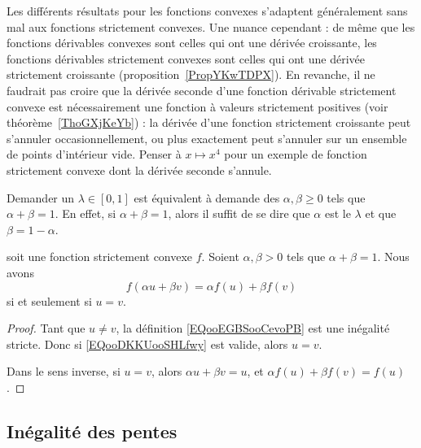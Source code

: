 \begin{normaltext}
	Les différents résultats pour les fonctions convexes s'adaptent généralement sans mal aux fonctions strictement convexes. Une nuance cependant : de même que les fonctions dérivables convexes sont celles qui ont une dérivée croissante, les fonctions dérivables strictement convexes sont celles qui ont une dérivée strictement croissante (proposition~\ref{PropYKwTDPX}). En revanche, il ne faudrait pas croire que la dérivée seconde d'une fonction dérivable strictement convexe est nécessairement une fonction à valeurs strictement positives (voir théorème~\ref{ThoGXjKeYb}) : la dérivée d'une fonction strictement croissante peut s'annuler occasionnellement, ou plus exactement peut s'annuler sur un ensemble de points d'intérieur vide. Penser à \( x\mapsto x^4\) pour un exemple de fonction strictement convexe dont la dérivée seconde s'annule.
\end{normaltext}

\begin{normaltext}
	Demander un \( \lambda\in[0 ,1]\) est équivalent à demande des \( \alpha,\beta\geq 0\) tels que \( \alpha+\beta=1\). En effet, si \( \alpha+\beta=1\), alors il suffit de se dire que \( \alpha\) est le \( \lambda\) et que \( \beta=1-\alpha\).
\end{normaltext}


\begin{lemma}		\label{LEMooXUDSooBUMnaZ}
	soit une fonction strictement convexe \( f\). Soient \( \alpha,\beta>0\) tels que \( \alpha+\beta=1\). Nous avons
	\begin{equation}		\label{EQooDKKUooSHLfwy}
		f(\alpha u+\beta v)=\alpha f(u)+\beta f(v)
	\end{equation}
	si et seulement si \( u=v\).
\end{lemma}

\begin{proof}
	Tant que \( u\neq v\), la définition \eqref{EQooEGBSooCevoPB} est une inégalité stricte. Donc si \eqref{EQooDKKUooSHLfwy} est valide, alors \( u=v\).

	Dans le sens inverse, si \( u=v\), alors \( \alpha u+\beta v=u\), et \( \alpha f(u)+\beta f(v)=f(u)\).
\end{proof}

\subsection{Inégalité des pentes}

